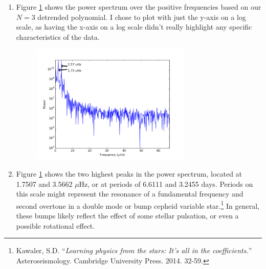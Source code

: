 \documentclass[10pt, preprint]{aastex}
\begin{document}
\begin{enumerate}
\item Figure \ref{fig3} shows the power spectrum over the positive frequencies based on our $N=3$ detrended polynomial. I chose to plot with just the y-axis on a log scale, as having the x-axis on a log scale didn't really highlight any specific characteristics of the data.
\begin{figure}[!ht]
\centering
\includegraphics[width=3in]{hw7_fig3.png}
\caption{\centering \label{fig3}}
\end{figure}
 
\item Figure \ref{fig3} shows the two highest peaks in the power spectrum, located at 1.7507 and 3.5662 $\mu$Hz, or at periods of 6.6111 and 3.2455 days. Periods on this scale might represent the resonance of a fundamental frequency and second overtone in a double mode or bump cepheid variable star.\footnote{Kawaler, S.D. ``\emph{Learning physics from the stars: It's all in the coefficients.}'' Asteroseismology. Cambridge University Press. 2014. 32-59.} In general, these bumps likely reflect the effect of some stellar pulsation, or even a possible rotational effect.



\end{enumerate}
\end{document}
